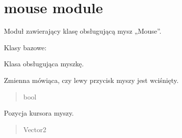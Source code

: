 \documentclass[letterpaper,10pt,polish]{sphinxmanual}
\begin{document}
\sphinxstepscope


\section{mouse module}
\label{\detokenize{mouse:module-mouse}}\label{\detokenize{mouse:mouse-module}}\label{\detokenize{mouse::doc}}
\sphinxAtStartPar
Moduł zawierający klasę obsługującą mysz „Mouse”.

\begin{fulllineitems}
\label{\detokenize{mouse:mouse.Mouse}}
\pysigstartsignatures
{}
\pysigstopsignatures
\sphinxAtStartPar
Klasy bazowe: 

\sphinxAtStartPar
Klasa obsługująca myszkę.

\begin{fulllineitems}
\label{\detokenize{mouse:mouse.Mouse.clicked}}
\pysigstartsignatures
{}
\pysigstopsignatures
\sphinxAtStartPar
Zmienna mówiąca, czy lewy przycisk myszy jest wciśnięty.
\begin{quote}\begin{description}
\sphinxAtStartPar
bool

\end{description}\end{quote}

\end{fulllineitems}


\begin{fulllineitems}
\label{\detokenize{mouse:mouse.Mouse.pos}}
\pysigstartsignatures
{}
\pysigstopsignatures
\sphinxAtStartPar
Pozycja kursora myszy.
\begin{quote}\begin{description}
\sphinxAtStartPar
Vector2

\end{description}\end{quote}


\end{fulllineitems}
\end{fulllineitems}
\end{document}
